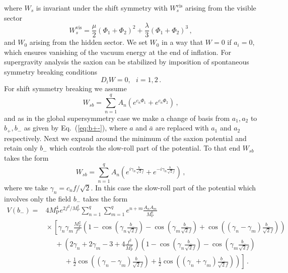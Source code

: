 \documentclass[12pt]{article}
\begin{document}
where $W_s$ is invariant under the shift symmetry with $W_s^\text{vis}$ arising from the visible sector
\begin{equation}
  W_s^\text{vis} =
      \frac{\mu}{2} \left(\Phi_1 + \Phi_2\right)^2
    + \frac{\lambda}{3} \left(\Phi_1 + \Phi_2\right)^3\,,
\end{equation}
and $W_0$ arising from the hidden sector. We set $W_0$ in a way that $W = 0$ if $a_i = 0$, which ensures vanishing of the vacuum energy at the end of inflation.
For supergravity analysis the saxion can be stabilized by imposition of spontaneous symmetry breaking conditions~\cite{Nath:1983aw}
\begin{equation}
  D_i W = 0,
  ~~~ i = 1, 2\,.
\end{equation}
For shift symmetry breaking we assume
\begin{equation}
  W_{sb} = \sum_{n = 1}^q A_n \left(e^{c_n \Phi_1} + e^{c_n \Phi_2}\right)\,,
\end{equation}
and as in the global supersymmetry case we make a change of basis from $a_1, a_2$ to $b_+, b_-$ as given by Eq.~(\ref{eq:b+-}), where $a$ and $\bar a$ are replaced with $a_1$ and $a_2$ respectively.
Next we expand around the minimum of the saxion potential and retain only $b_-$ which controls the slow-roll part of the potential.
To that end $W_{sb}$ takes the form
\begin{equation}
  W_{sb} = \sum_{n = 1}^q A_n \left(
      e^{i \gamma_n \frac{b_-}{\sqrt{2} f}}
    + e^{-i \gamma_n \frac{b_-}{\sqrt{2} f}}
  \right)\,,
\end{equation}
where we take $\gamma_n = c_n f / \sqrt{2}$.
In this case the slow-roll part of the potential which involves only the field $b_-$ takes the form
\begin{equation} \label{eq:supergravity:Vslow}
  \begin{aligned}
    V\left(b_-\right) =
      & 4 M_\text{P}^4 e^{2 f^2 / M_\text{P}^2} \sum_{n = 1}^q \sum_{m = 1}^q
        e^{n + m} \frac{A_n A_m}{M_\text{P}^6}\\
        &{} \times \left[
          \gamma_n \gamma_m \frac{M_\text{P}^2}{f^2} \left(
              1
            - \cos\left(\gamma_n \frac{b_-}{\sqrt{2} f}\right)
            - \cos\left(\gamma_m \frac{b_-}{\sqrt{2} f}\right)
            + \cos\left(\left(\gamma_n - \gamma_m\right) \frac{b_-}{\sqrt{2} f}\right)
          \right)\right.\\
          &~~~~~~ + \left(2 \gamma_n + 2 \gamma_m - 3 + 4 \frac{f^2}{M_\text{P}^2}\right) \left(
              1
            - \cos\left(\gamma_n \frac{b_-}{\sqrt{2} f}\right)
            - \cos\left(\gamma_m \frac{b_-}{\sqrt{2} f}\right)\right.\\
            &~~~~~~~~~~~~ \left.\left.{}
            + \frac{1}{2} \cos\left(\left(\gamma_n - \gamma_m\right) \frac{b_-}{\sqrt{2} f}\right)
            + \frac{1}{2} \cos\left(\left(\gamma_n + \gamma_m\right) \frac{b_-}{\sqrt{2} f}\right)
          \right)
        \right]\,.
  \end{aligned}
\end{equation}
\end{document}
